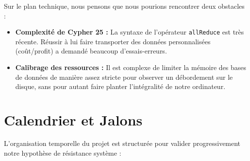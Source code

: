 \documentclass{article}
\begin{document}
    Sur le plan technique, nous pensons que nous pourions rencontrer deux obstacles :

    \begin{itemize}

        \item \textbf{Complexité de Cypher 25 :} La syntaxe de l'opérateur \texttt{allReduce} est très récente. Réussir à lui faire transporter des données personnalisées (coût/profit) a demandé beaucoup d'essais-erreurs. \\
        \item \textbf{Calibrage des ressources :} Il est complexe de limiter la mémoire des bases de données de manière assez stricte pour observer un débordement sur le disque, sans pour autant faire planter l'intégralité de notre ordinateur. \\
    
    \end{itemize}

    \section{Calendrier et Jalons}

    L'organisation temporelle du projet est structurée pour valider progressivement notre hypothèse de résistance système :
\end{document}
